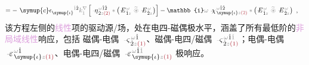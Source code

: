 \begin{subequations}
\begin{align}
	= -~ {\symup{c}} \epsilon^{\hphantom{\symup{\iota}}\mathcolor{gray}{\dot{1}}\dot{2}}_{\symup{\iota}} \mathcolor{gray}{k^\nabla_{\dot{1}}} \left[ \Xint{\begin{smallmatrix} ~ \\ {}^{}_{\mathcolor{gray}{-}} \\ ~ \end{smallmatrix}}{17}{\eta}^{\;\! \mathcolor{gray}{\omega} \hat{1} \hat{2}}_{\;\! \dot{2} \mathcolor{gray}{z} \textcolor{Maroon}{(2)}} \mathcolor{gray}{*} \left( \Xint{\mathcolor{gray}{-}}{295}{E}^{\;\!\mathcolor{gray}{\omega}}_{\;\! \hat{1} \mathcolor{gray}{z}} ~\mathcolor{gray}{\widetilde \circledast}~ \Xint{\mathcolor{gray}{-}}{295}{E}^{\;\!\mathcolor{gray}{\omega}}_{\;\! \hat{2} \mathcolor{gray}{z}} \right) \right] &- \mathbb{i} \mathcolor{gray}{\omega} ~\Xint{{}^{}_{\mathcolor{gray}{-}}}{23}{\chi}^{\;\! \mathcolor{gray}{\omega} \hat{1} \hat{2}}_{\;\! \symup{\iota} \mathcolor{gray}{z} \textcolor{Maroon}{(2)}} \mathcolor{gray}{*} \left( \Xint{\mathcolor{gray}{-}}{295}{E}^{\;\!\mathcolor{gray}{\omega}}_{\;\! \hat{1} \mathcolor{gray}{z}} ~\mathcolor{gray}{\widetilde \circledast}~ \Xint{\mathcolor{gray}{-}}{295}{E}^{\;\!\mathcolor{gray}{\omega}}_{\;\! \hat{2} \mathcolor{gray}{z}} \right)~,
\end{align}
\end{subequations}
该方程左侧的\textcolor{Plum}{线性}项的\textcolor{NavyBlue}{驱动源}/\textcolor{NavyBlue}{场}，处在\textcolor{NavyBlue}{电四-磁偶}极水平，涵盖了所有最低阶的\textcolor{Plum}{非局域}\textcolor{Plum}{线性}响应，包括 \textcolor{NavyBlue}{磁偶-电偶} $\Xint{\begin{smallmatrix} ~ \\ {}^{}_{\mathcolor{gray}{-}} \\ ~ \end{smallmatrix}}{13}{\varsigma}^{\;\! \mathcolor{gray}{\omega} \hat{1}}_{\;\! \dot{2} \mathcolor{gray}{z} \textcolor{Maroon}{(1)}}$、\textcolor{NavyBlue}{磁偶-电四/磁偶} $\Xint{\begin{smallmatrix} ~ \\ {}^{}_{\mathcolor{gray}{-}} \\ ~ \end{smallmatrix}}{13}{\varsigma}^{\;\! \mathcolor{gray}{\omega} \hat{1} \mathcolor{gray}{\check{1}}}_{\;\! \dot{2} \mathcolor{gray}{z} \textcolor{Maroon}{(1)}}$；\textcolor{NavyBlue}{电偶-电偶} $\Xint{\begin{smallmatrix} ~ \\ {}^{}_{\mathcolor{gray}{-}} \\ ~ \end{smallmatrix}}{16}{\varepsilon}^{\;\! \mathcolor{gray}{\omega} \hat{1}}_{\;\! \symup{\iota} \mathcolor{gray}{z} \textcolor{Maroon}{(1)}}$、\textcolor{NavyBlue}{电偶-电四/磁偶} $\Xint{\begin{smallmatrix} ~ \\ {}^{}_{\mathcolor{gray}{-}} \\ ~ \end{smallmatrix}}{16}{\varepsilon}^{\;\! \mathcolor{gray}{\omega} \hat{1} \mathcolor{gray}{\check{1}}}_{\;\! \symup{\iota} \mathcolor{gray}{z} \textcolor{Maroon}{(1)}}$ 极响应。


